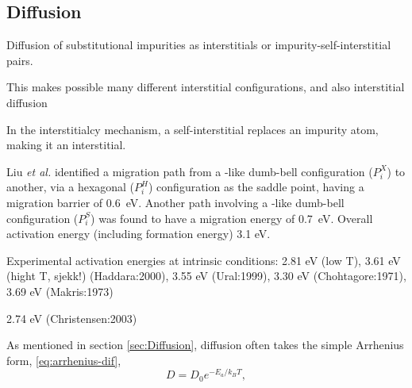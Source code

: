 \documentclass[11pt,bibliography=totoc,index=totoc]{scrbook}   %
\begin{document}
\subsection{Diffusion}\label{sec:PDiffusion}
%

Diffusion of substitutional impurities as interstitials or impurity-self-interstitial pairs.

This makes possible many different interstitial configurations, and also interstitial diffusion

In the interstitialcy mechanism, a self-interstitial  replaces an impurity atom, making it an interstitial.

Liu \textit{et al.} identified a migration path from a -like dumb-bell configuration ($P_i^X$) to another, via a hexagonal ($P_i^H$) configuration as the saddle point, having a migration barrier of 0.6~eV.\cite{Liu:2003}
Another path involving a -like dumb-bell configuration ($P_i^S$) was found to have a migration energy of 0.7~eV. Overall activation energy (including formation energy) 3.1 eV.

Experimental activation energies at intrinsic conditions: 2.81 eV (low T), 3.61 eV (hight T, sjekk!) (Haddara:2000), 3.55 eV (Ural:1999), 3.30 eV (Chohtagore:1971), 3.69 eV (Makris:1973)

2.74 eV (Christensen:2003)

As mentioned in section \ref{sec:Diffusion}, diffusion often takes the simple Arrhenius form, \eqref{eq:arrhenius-dif},
\begin{equation*}
    D = D_0 e^{-E_a/k_BT},
\end{equation*}
\end{document}
